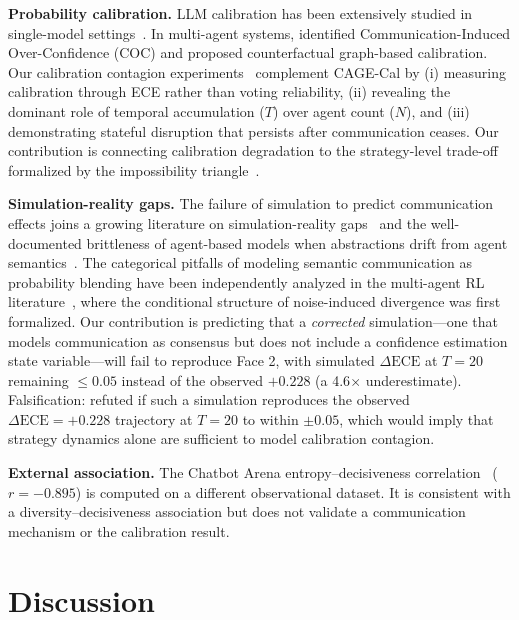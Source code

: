 \documentclass[11pt]{article}
\begin{document}
\textbf{Probability calibration.} LLM calibration has been extensively studied in single-model settings~\cite{guo2017calibration,jiang2021can}. In multi-agent systems, \citet{huang2026cagecal} identified Communication-Induced Over-Confidence (COC) and proposed counterfactual graph-based calibration. Our calibration contagion experiments~\cite{calibration2026} complement CAGE-Cal by (i) measuring calibration through ECE rather than voting reliability, (ii) revealing the dominant role of temporal accumulation ($T$) over agent count ($N$), and (iii) demonstrating stateful disruption that persists after communication ceases. Our contribution is connecting calibration degradation to the strategy-level trade-off formalized by the impossibility triangle~\cite{impossible2026}.

\textbf{Simulation-reality gaps.} The failure of simulation to predict communication effects joins a growing literature on simulation-reality gaps~\cite{richter2024bridging} and the well-documented brittleness of agent-based models when abstractions drift from agent semantics~\cite{foerster2018emergent}. The categorical pitfalls of modeling semantic communication as probability blending have been independently analyzed in the multi-agent RL literature~\cite{foerster2016learning,kapetanakis2014balanced}, where the conditional structure of noise-induced divergence was first formalized. Our contribution is predicting that a \textit{corrected} simulation---one that models communication as consensus but does not include a confidence estimation state variable---will fail to reproduce Face 2, with simulated $\Delta\text{ECE}$ at $T = 20$ remaining $\leq 0.05$ instead of the observed $+0.228$ (a 4.6$\times$ underestimate). Falsification: refuted if such a simulation reproduces the observed $\Delta\text{ECE} = +0.228$ trajectory at $T = 20$ to within $\pm 0.05$, which would imply that strategy dynamics alone are sufficient to model calibration contagion.

\textbf{External association.} The Chatbot Arena entropy--decisiveness correlation~\cite{zheng2023chatbot,chiang2024chatbot} ($r=-0.895$) is computed on a different observational dataset. It is consistent with a diversity--decisiveness association but does not validate a communication mechanism or the calibration result.

\section{Discussion}
\end{document}
